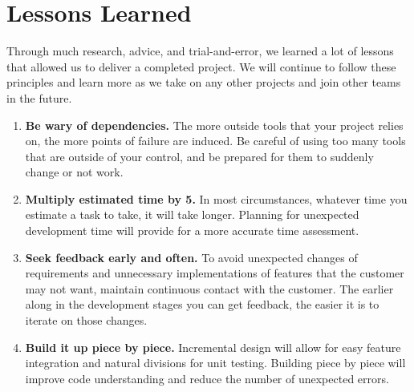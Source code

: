 \section{Lessons Learned}
Through much research, advice, and trial-and-error, we learned a lot of lessons that allowed us to deliver a completed project. We will continue to follow these principles and learn more as we take on any other projects and join other teams in the future.
\begin{enumerate}
	\item \textbf{Be wary of dependencies.} The more outside tools that your project relies on, the more points of failure are induced. Be careful  of using too many tools that are outside of your control, and be prepared for them to suddenly change or not work.
	\item \textbf{Multiply estimated time by 5.} In most circumstances, whatever time you estimate a task to take, it will take longer. Planning for unexpected development time will provide for a more accurate time assessment. 
	\item \textbf{Seek feedback early and often.} To avoid unexpected changes of requirements and unnecessary implementations of features that the customer may not want, maintain continuous contact with the customer. The earlier along in the development stages you can get feedback, the easier it is to iterate on those changes.
	\item \textbf{Build it up piece by piece.} Incremental design will allow for easy feature integration and natural divisions for unit testing. Building piece by piece will improve code understanding and reduce the number of unexpected errors.
\end{enumerate}

